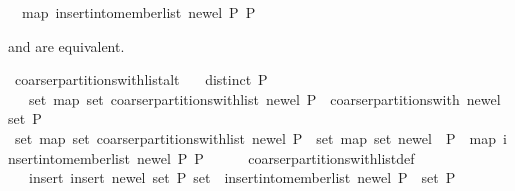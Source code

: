 \begin{isabellebody}
\ \ {\isacharparenleft}map\ {\isacharparenleft}{\isacharparenleft}insert{\isacharunderscore}into{\isacharunderscore}member{\isacharunderscore}list\ new{\isacharunderscore}el\ P{\isacharparenright}{\isacharparenright}\ P{\isacharparenright}{\isachardoublequoteclose}%
\begin{isamarkuptext}%
 and  are equivalent.%
\end{isamarkuptext}%
\isamarkuptrue%
\isamarkupfalse%
\ coarser{\isacharunderscore}partitions{\isacharunderscore}with{\isacharunderscore}list{\isacharunderscore}alt{\isacharcolon}\isanewline
\ \ \ {\isachardoublequoteopen}distinct\ P{\isachardoublequoteclose}\isanewline
\ \ \ {\isachardoublequoteopen}set\ {\isacharparenleft}map\ set\ {\isacharparenleft}coarser{\isacharunderscore}partitions{\isacharunderscore}with{\isacharunderscore}list\ new{\isacharunderscore}el\ P{\isacharparenright}{\isacharparenright}\ {\isacharequal}\ coarser{\isacharunderscore}partitions{\isacharunderscore}with\ new{\isacharunderscore}el\ {\isacharparenleft}set\ P{\isacharparenright}{\isachardoublequoteclose}\isanewline
%
\isadelimproof
%
\endisadelimproof
%
\isatagproof
{}\isamarkupfalse%
\ {\isacharminus}\isanewline
\ \ \isamarkupfalse%
\ {\isachardoublequoteopen}set\ {\isacharparenleft}map\ set\ {\isacharparenleft}coarser{\isacharunderscore}partitions{\isacharunderscore}with{\isacharunderscore}list\ new{\isacharunderscore}el\ P{\isacharparenright}{\isacharparenright}\ {\isacharequal}\ set\ {\isacharparenleft}map\ set\ {\isacharparenleft}{\isacharparenleft}{\isacharbraceleft}new{\isacharunderscore}el{\isacharbraceright}\ {\isacharhash}\ P{\isacharparenright}\ {\isacharhash}\ {\isacharparenleft}map\ {\isacharparenleft}{\isacharparenleft}insert{\isacharunderscore}into{\isacharunderscore}member{\isacharunderscore}list\ new{\isacharunderscore}el\ P{\isacharparenright}{\isacharparenright}\ P{\isacharparenright}{\isacharparenright}{\isacharparenright}{\isachardoublequoteclose}\isanewline
\ \ \ \ \isamarkupfalse%
\ coarser{\isacharunderscore}partitions{\isacharunderscore}with{\isacharunderscore}list{\isacharunderscore}def\ \isacommand{{\isachardot}{\isachardot}}\isamarkupfalse%
\isanewline
\ \ \isamarkupfalse%
\ \isamarkupfalse%
\ {\isachardoublequoteopen}{\isasymdots}\ {\isacharequal}\ insert\ {\isacharparenleft}insert\ {\isacharbraceleft}new{\isacharunderscore}el{\isacharbraceright}\ {\isacharparenleft}set\ P{\isacharparenright}{\isacharparenright}\ {\isacharparenleft}{\isacharparenleft}set\ {\isasymcirc}\ {\isacharparenleft}insert{\isacharunderscore}into{\isacharunderscore}member{\isacharunderscore}list\ new{\isacharunderscore}el\ P{\isacharparenright}{\isacharparenright}\ {\isacharbackquote}\ set\ P{\isacharparenright}{\isachardoublequoteclose}\isanewline

\end{isabellebody}
